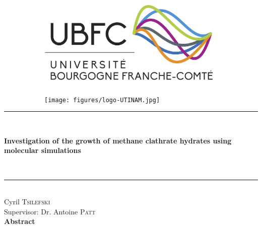 \thispagestyle{empty}
\setcounter{page}{0}
\begin{center}
    \begin{figure}[!hb]
        \centering
        \begin{subfigure}{.45\linewidth}
            \centering
            \includegraphics[width=.99\linewidth]{figures/logo-ubfc.png}
        \end{subfigure}
        \hfill
        \begin{subfigure}{.45\linewidth}
            \centering
            \texttt{[image: figures/logo-UTINAM.jpg]}
        \end{subfigure}
    \end{figure}
    
    \vspace{7\baselineskip}
    \rule{1\textwidth}{1pt}\\
    \vspace{\baselineskip}
    \begin{Huge}\textbf{Investigation of the growth of methane clathrate hydrates using molecular simulations}\end{Huge}\\
    \vspace{0.5\baselineskip}
    \rule{1\textwidth}{1pt}\\
    \vspace{\baselineskip}
    \vspace{\baselineskip}
    \vspace{\baselineskip}
    \vspace{\baselineskip}
    \vspace{\baselineskip}
    {\LARGE Cyril \textsc{Tsilefski}}\\
    \vspace{\baselineskip}
    {\large Supervisor: Dr. Antoine \textsc{Patt}}\\
    \vspace{\baselineskip}
    \vspace{\baselineskip}
    \vspace{\baselineskip}
    {\centering \large\textbf{Abstract}}
\end{center}
\setcounter{figure}{0}
